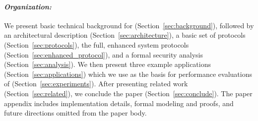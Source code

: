 \paragraph{\em Organization:} We present basic technical background for \tc (Section~\ref{sec:background}), followed by an architectural description (Section~\ref{sec:architecture}), a basic set of protocols (Section~\ref{sec:protocols}), the full, enhanced system protocols (Section~\ref{sec:enhanced_protocol}), and a formal security analysis (Section~\ref{sec:analysis}). We then present three example applications (Section~\ref{sec:applications}) which we use as the basis for performance evaluations of \tc (Section~\ref{sec:experiments}).  After presenting related work (Section~\ref{sec:related}), we conclude the paper (Section~\ref{sec:conclude}). The paper appendix includes implementation details, formal modeling and proofs, and future directions omitted from the paper body.







